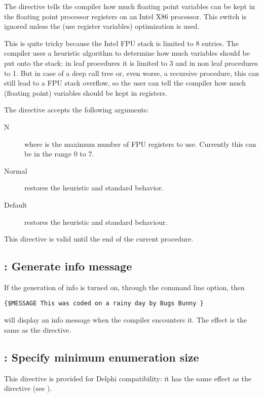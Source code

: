 The  directive tells the compiler how much floating point
variables can be kept in the floating point processor registers on an Intel
X86 processor. This switch is ignored unless the  (use register variables) 
optimization is used.

This is quite tricky because the Intel FPU stack is limited to 8 entries.
The compiler uses a heuristic algorithm to determine how much variables should be
put onto the stack: in leaf procedures it is limited to 3 and in non leaf
procedures to 1. But in case of a deep call tree or, even worse, a recursive
procedure, this can still lead to a FPU stack overflow, so the user can tell
the compiler how much (floating point) variables should be kept in registers.

The directive accepts the following arguments:

\begin{description}
\item [N] where  is the maximum number of FPU registers to use.
Currently this can be in the range 0 to 7.
\item[Normal] restores the heuristic and standard behavior.
\item[Default] restores the heuristic and standard behaviour.
\end{description}

\begin{remark}This directive is valid until the end of the current procedure.
\end{remark}

\subsection{ : Generate info message}

If the generation of info is turned on, through the  command line
option, then
\begin{verbatim}
{$MESSAGE This was coded on a rainy day by Bugs Bunny }
\end{verbatim}
will display an info message when the compiler encounters it. The effect is
the same as the  directive.

\subsection{ : Specify minimum enumeration size}

This directive is provided for Delphi compatibility: it has the same effect
as the  directive (see ).

